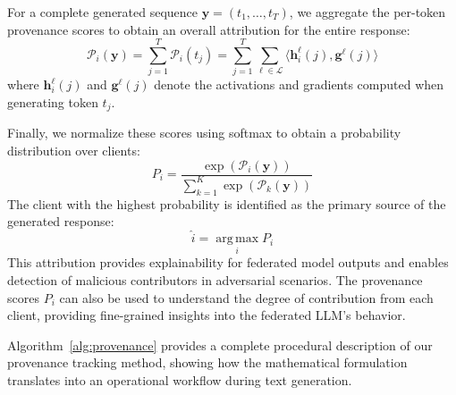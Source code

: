 For a complete generated sequence $\mathbf{y} = (t_1, \ldots, t_T)$, we aggregate the per-token provenance scores to obtain an overall attribution for the entire response:
\begin{equation}
  \label{eq:sequence-aggregation}
  \mathcal{P}_i(\mathbf{y}) = \sum_{j=1}^T \mathcal{P}_i(t_j) = \sum_{j=1}^T \sum_{\ell \in \mathcal{L}} \langle \mathbf{h}_i^\ell(j), \mathbf{g}^\ell(j) \rangle
\end{equation}
where $\mathbf{h}_i^\ell(j)$ and $\mathbf{g}^\ell(j)$ denote the activations and gradients computed when generating token $t_j$.

Finally, we normalize these scores using softmax to obtain a probability distribution over clients:
\begin{equation}
  \label{eq:provenance-probability}
  P_i = \frac{\exp(\mathcal{P}_i(\mathbf{y}))}{\sum_{k=1}^K \exp(\mathcal{P}_k(\mathbf{y}))}
\end{equation}
The client with the highest probability is identified as the primary source of the generated response:
\begin{equation}
  \label{eq:attribution}
  \hat{i} = \operatorname*{arg\,max}_{i} P_i
\end{equation}
This attribution provides explainability for federated model outputs and enables detection of malicious contributors in adversarial scenarios.
The provenance scores $P_i$ can also be used to understand the degree of contribution from each client, providing fine-grained insights into the federated LLM's behavior.

Algorithm~\ref{alg:provenance} provides a complete procedural description of our provenance tracking method, showing how the mathematical formulation translates into an operational workflow during text generation.

